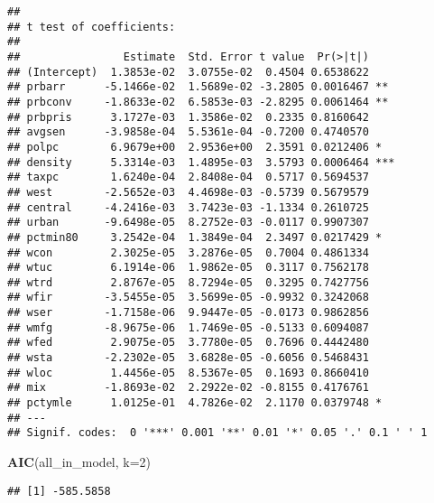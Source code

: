 \documentclass[
]{article}
\newenvironment{Shaded}{\begin{snugshade}}{\end{snugshade}}
\newcommand{\DataTypeTok}[1]{\textcolor[rgb]{0.13,0.29,0.53}{#1}}
\newcommand{\DecValTok}[1]{\textcolor[rgb]{0.00,0.00,0.81}{#1}}
\newcommand{\KeywordTok}[1]{\textcolor[rgb]{0.13,0.29,0.53}{\textbf{#1}}}
\newcommand{\NormalTok}[1]{#1}
\begin{document}
\begin{verbatim}
## 
## t test of coefficients:
## 
##                Estimate  Std. Error t value  Pr(>|t|)    
## (Intercept)  1.3853e-02  3.0755e-02  0.4504 0.6538622    
## prbarr      -5.1466e-02  1.5689e-02 -3.2805 0.0016467 ** 
## prbconv     -1.8633e-02  6.5853e-03 -2.8295 0.0061464 ** 
## prbpris      3.1727e-03  1.3586e-02  0.2335 0.8160642    
## avgsen      -3.9858e-04  5.5361e-04 -0.7200 0.4740570    
## polpc        6.9679e+00  2.9536e+00  2.3591 0.0212406 *  
## density      5.3314e-03  1.4895e-03  3.5793 0.0006464 ***
## taxpc        1.6240e-04  2.8408e-04  0.5717 0.5694537    
## west        -2.5652e-03  4.4698e-03 -0.5739 0.5679579    
## central     -4.2416e-03  3.7423e-03 -1.1334 0.2610725    
## urban       -9.6498e-05  8.2752e-03 -0.0117 0.9907307    
## pctmin80     3.2542e-04  1.3849e-04  2.3497 0.0217429 *  
## wcon         2.3025e-05  3.2876e-05  0.7004 0.4861334    
## wtuc         6.1914e-06  1.9862e-05  0.3117 0.7562178    
## wtrd         2.8767e-05  8.7294e-05  0.3295 0.7427756    
## wfir        -3.5455e-05  3.5699e-05 -0.9932 0.3242068    
## wser        -1.7158e-06  9.9447e-05 -0.0173 0.9862856    
## wmfg        -8.9675e-06  1.7469e-05 -0.5133 0.6094087    
## wfed         2.9075e-05  3.7780e-05  0.7696 0.4442480    
## wsta        -2.2302e-05  3.6828e-05 -0.6056 0.5468431    
## wloc         1.4456e-05  8.5367e-05  0.1693 0.8660410    
## mix         -1.8693e-02  2.2922e-02 -0.8155 0.4176761    
## pctymle      1.0125e-01  4.7826e-02  2.1170 0.0379748 *  
## ---
## Signif. codes:  0 '***' 0.001 '**' 0.01 '*' 0.05 '.' 0.1 ' ' 1
\end{verbatim}

\begin{Shaded}
\begin{Highlighting}[]
\KeywordTok{AIC}\NormalTok{(all_in_model, }\DataTypeTok{k=}\DecValTok{2}\NormalTok{)}
\end{Highlighting}
\end{Shaded}

\begin{verbatim}
## [1] -585.5858
\end{verbatim}
\end{document}
